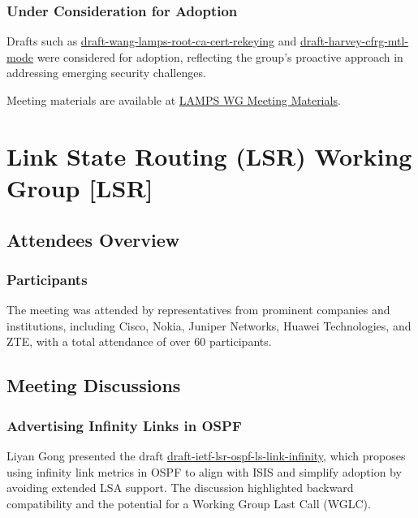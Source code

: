 \documentclass{article}
\begin{document}
\subsubsection{Under Consideration for Adoption}
Drafts such as \href{https://datatracker.ietf.org/doc/html/draft-wang-lamps-root-ca-cert-rekeying}{draft-wang-lamps-root-ca-cert-rekeying} and \href{https://datatracker.ietf.org/doc/html/draft-harvey-cfrg-mtl-mode}{draft-harvey-cfrg-mtl-mode} were considered for adoption, reflecting the group's proactive approach in addressing emerging security challenges.

Meeting materials are available at \href{https://www.ietf.org/proceedings/121/lamps.html}{LAMPS WG Meeting Materials}.




\newpage

\section{Link State Routing (LSR) Working Group [LSR]}

\subsection{Attendees Overview}
\subsubsection{Participants}
The meeting was attended by representatives from prominent companies and institutions, including Cisco, Nokia, Juniper Networks, Huawei Technologies, and ZTE, with a total attendance of over 60 participants.

\subsection{Meeting Discussions}

\subsubsection{Advertising Infinity Links in OSPF}
Liyan Gong presented the draft \href{https://datatracker.ietf.org/doc/html/draft-ietf-lsr-ospf-ls-link-infinity}{draft-ietf-lsr-ospf-ls-link-infinity}, which proposes using infinity link metrics in OSPF to align with ISIS and simplify adoption by avoiding extended LSA support. The discussion highlighted backward compatibility and the potential for a Working Group Last Call (WGLC).
\end{document}
